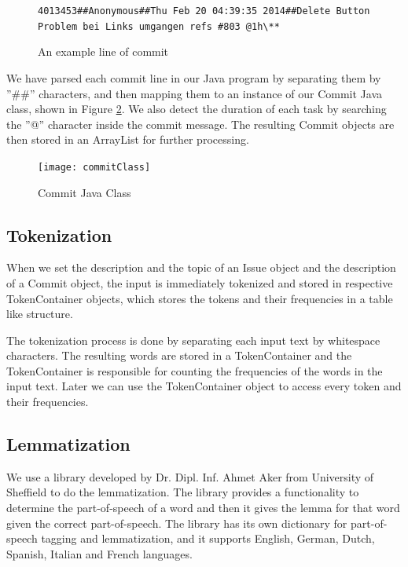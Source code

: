 \begin{figure}
\centering
\verb/4013453##Anonymous##Thu Feb 20 04:39:35 2014##Delete Button Problem bei Links umgangen refs #803 @1h\**  /
\caption{An example line of commit}
\label{fig:commitLine}
\end{figure}

We have parsed each commit line in our Java program by separating them by ''\#\#'' characters, and then mapping them to an instance of our Commit Java class, shown in Figure \ref{fig:commit}.
We also detect the duration of each task by searching the ''@'' character inside the commit message.
The resulting Commit objects are then stored in an ArrayList for further processing.

\begin{figure}
\centering
\texttt{[image: commitClass]}
\caption{Commit Java Class}
\label{fig:commit}
\end{figure}

\subsection{Tokenization}

When we set the description and the topic of an Issue object and the description of a Commit object, the input is immediately tokenized and stored in respective TokenContainer objects, which stores the tokens and their frequencies in a table like structure.

The tokenization process is done by separating each input text by whitespace characters.
The resulting words are stored in a TokenContainer and the TokenContainer is responsible for counting the frequencies of the words in the input text.
Later we can use the TokenContainer object to access every token and their frequencies.


\subsection{Lemmatization}

We use a library developed by Dr. Dipl. Inf. Ahmet Aker from University of Sheffield to do the lemmatization.
The library provides a functionality to determine the part-of-speech of a word and then it gives the lemma for that word given the correct part-of-speech.
The library has its own dictionary for part-of-speech tagging and lemmatization, and it supports English, German, Dutch, Spanish, Italian and French languages.\\

